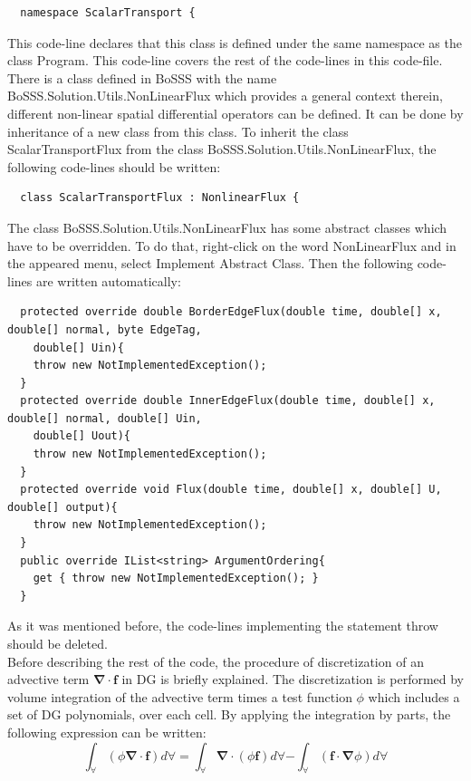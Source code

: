 \documentclass[11pt,twoside,a4paper]{fdyartcl}
\begin{document}
{{{\begin{verbatim}
  namespace ScalarTransport {
\end{verbatim}}
This code-line declares that this class is defined under the same namespace as the class {\scriptsize Program}. This code-line covers the rest of the code-lines in this code-file. There is a class defined in BoSSS with the name {\scriptsize BoSSS.Solution.Utils.NonLinearFlux} which provides a general context therein, different non-linear spatial differential operators can be defined. It can be done by inheritance of a new class from this class. To inherit the class {\scriptsize ScalarTransportFlux} from the class {\scriptsize BoSSS.Solution.Utils.NonLinearFlux}, the following code-lines should be written:
{\scriptsize \begin{verbatim}
  class ScalarTransportFlux : NonlinearFlux {
\end{verbatim}}
 The class {\scriptsize BoSSS.Solution.Utils.NonLinearFlux} has some abstract classes which have to be overridden. To do that, right-click on the word {\scriptsize NonLinearFlux} and in the appeared menu, select {\scriptsize Implement Abstract Class}. Then the following code-lines are written automatically:
{\scriptsize \begin{verbatim}
  protected override double BorderEdgeFlux(double time, double[] x, double[] normal, byte EdgeTag, 
	double[] Uin){
    throw new NotImplementedException();
  }
  protected override double InnerEdgeFlux(double time, double[] x, double[] normal, double[] Uin, 
	double[] Uout){
    throw new NotImplementedException();
  }
  protected override void Flux(double time, double[] x, double[] U, double[] output){
    throw new NotImplementedException();
  }
  public override IList<string> ArgumentOrdering{
    get { throw new NotImplementedException(); }
  }
\end{verbatim}}
As it was mentioned before, the code-lines implementing the statement {\scriptsize throw} should be deleted.\\
Before describing the rest of the code, the procedure of discretization of an advective term $\mathbf{\nabla}\cdot\mathbf{f}$ in DG is briefly explained. The discretization is performed by volume integration of the advective term times a test function $\phi$ which includes a set of DG polynomials, over each cell. By applying the integration by parts, the following expression can be written:
\begin{equation}
\int_\forall\left(\phi\mathbf{\nabla}\cdot\mathbf{f}\right)d\forall=\int_\forall\mathbf{\nabla}\cdot\left(\phi\mathbf{f}\right)d\forall-\int_\forall\left(\mathbf{f}\cdot\mathbf{\nabla}\phi\right)d\forall

\end{equation}}}
\end{document}
